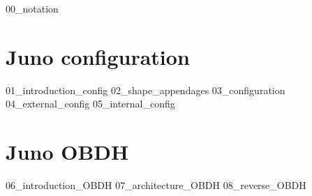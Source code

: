 \pagebreak
{00_notation}
\pagebreak
{}

\section{Juno configuration}
\label{sec:juno_config}

{01_introduction_config}
{02_shape_appendages}
{03_configuration}
{04_external_config}
{05_internal_config}

\pagebreak

\section{Juno OBDH}
\label{sec:juno_OBDH}

{06_introduction_OBDH}
{07_architecture_OBDH}
{08_reverse_OBDH}